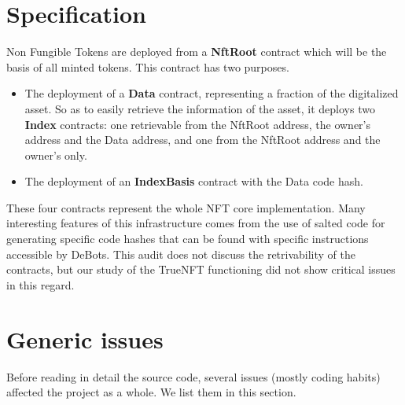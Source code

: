 \section{Specification}

Non Fungible Tokens are deployed from a \textbf{NftRoot} contract which will
be the basis of all minted tokens.
%
This contract has two purposes.
\begin{itemize}
    \item The deployment of a \textbf{Data} contract, representing a fraction of the
    digitalized asset. So as to easily retrieve the information of the asset, 
    it deploys two \textbf{Index} contracts: one retrievable from the NftRoot address,
    the owner's address and the Data address, and one from the NftRoot address
    and the owner's only. 
    \item The deployment of an \textbf{IndexBasis} contract with the Data code hash.
\end{itemize}

These four contracts represent the whole NFT core implementation.
%
Many interesting features of this infrastructure comes from the use of salted code
for generating specific code hashes that can be found with specific instructions accessible 
by DeBots.
%
This audit does not discuss the retrivability of the contracts, but our study of the TrueNFT 
functioning did not show critical issues in this regard.

\section{Generic issues}

Before reading in detail the source code, several issues (mostly coding habits) affected the
project as a whole. We list them in this section.



